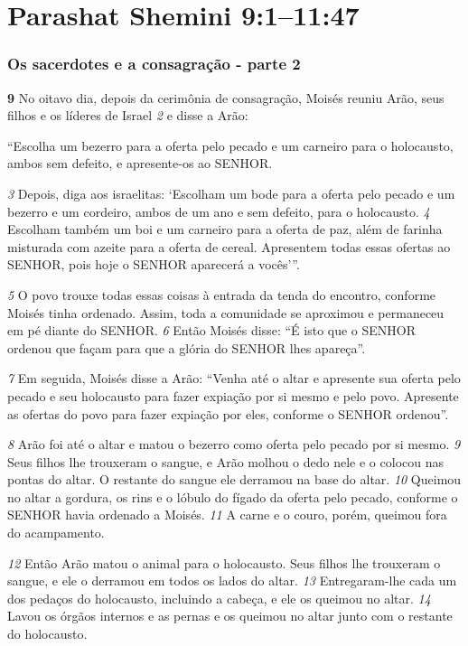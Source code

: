\section*{Parashat Shemini 9:1–11:47}

\subsubsection*{Os sacerdotes e a consagração - parte 2}
\textbf{\large 9} No oitavo dia, depois da cerimônia de consagração, Moisés reuniu Arão, seus
filhos e os líderes de Israel 
\textit{\tiny 2} 
e disse a Arão: 

\smallskip
“Escolha um bezerro para a oferta pelo
pecado e um carneiro para o holocausto, ambos sem defeito, e apresente-os ao
SENHOR. 

\smallskip
\textit{\tiny 3} 
Depois, diga aos israelitas: ‘Escolham um bode para a oferta pelo pecado
e um bezerro e um cordeiro, ambos de um ano e sem defeito, para o holocausto. 
\textit{\tiny 4} 
Escolham também um boi e um carneiro para a oferta de paz, além de farinha
misturada com azeite para a oferta de cereal. Apresentem todas essas ofertas ao
SENHOR, pois hoje o SENHOR aparecerá a vocês’”. 

\smallskip
\textit{\tiny 5} 
O povo trouxe todas essas coisas à entrada da tenda do encontro, conforme
Moisés tinha ordenado. Assim, toda a comunidade se aproximou e permaneceu
em pé diante do SENHOR. 
\textit{\tiny 6} 
Então Moisés disse: “É isto que o SENHOR ordenou que
façam para que a glória do SENHOR lhes apareça”. 

\smallskip
\textit{\tiny 7} 
Em seguida, Moisés disse a Arão: “Venha até o altar e apresente sua oferta pelo
pecado e seu holocausto para fazer expiação por si mesmo e pelo povo. Apresente
as ofertas do povo para fazer expiação por eles, conforme o SENHOR ordenou”. 

\smallskip
\textit{\tiny 8} 
Arão foi até o altar e matou o bezerro como oferta pelo pecado por si mesmo. 
\textit{\tiny 9} 
Seus filhos lhe trouxeram o sangue, e Arão molhou o dedo nele e o colocou nas
pontas do altar. O restante do sangue ele derramou na base do altar. 
\textit{\tiny 10}
Queimou
no altar a gordura, os rins e o lóbulo do fígado da oferta pelo pecado, conforme o
SENHOR havia ordenado a Moisés. 
\textit{\tiny 11}
A carne e o couro, porém, queimou fora do
acampamento.

\smallskip
\textit{\tiny 12}
Então Arão matou o animal para o holocausto. Seus filhos lhe trouxeram o
sangue, e ele o derramou em todos os lados do altar. 
\textit{\tiny 13}
Entregaram-lhe cada um
dos pedaços do holocausto, incluindo a cabeça, e ele os queimou no altar. 
\textit{\tiny 14}
Lavou
os órgãos internos e as pernas e os queimou no altar junto com o restante do
holocausto.

